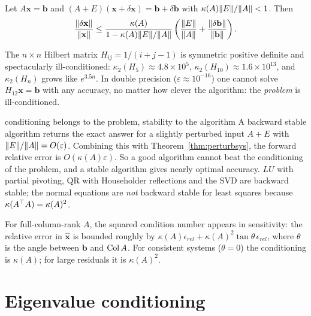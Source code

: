 \begin{theorem}[Sensitivity of $A\mathbf{x}=\mathbf{b}$]\label{thm:perturbsys}
Let $A\mathbf{x}=\mathbf{b}$ and $(A+E)(\mathbf{x}+\delta\mathbf{x})=\mathbf{b}+\delta\mathbf{b}$ with $\kappa(A)\lVert E\rVert/\lVert A\rVert<1$. Then
\[ \frac{\lVert\delta\mathbf{x}\rVert}{\lVert\mathbf{x}\rVert}\le\frac{\kappa(A)}{1-\kappa(A)\lVert E\rVert/\lVert A\rVert}\left(\frac{\lVert E\rVert}{\lVert A\rVert}+\frac{\lVert\delta\mathbf{b}\rVert}{\lVert\mathbf{b}\rVert}\right). \]
\end{theorem}

\begin{example}
The $n\times n$ Hilbert matrix $H_{ij}=1/(i+j-1)$ is symmetric positive definite and spectacularly ill-conditioned: $\kappa_2(H_5)\approx4.8\times10^5$, $\kappa_2(H_{10})\approx1.6\times10^{13}$, and $\kappa_2(H_n)$ grows like $e^{3.5n}$. In double precision ($\varepsilon\approx10^{-16}$) one cannot solve $H_{12}\mathbf{x}=\mathbf{b}$ with any accuracy, no matter how clever the algorithm: the \emph{problem} is ill-conditioned.
\end{example}

\begin{nuance}{conditioning belongs to the problem, stability to the algorithm}
A backward stable algorithm returns the exact answer for a slightly perturbed input $A+E$ with $\lVert E\rVert/\lVert A\rVert=O(\varepsilon)$. Combining this with Theorem~\ref{thm:perturbsys}, the forward relative error is $O(\kappa(A)\varepsilon)$. So a good algorithm cannot beat the conditioning of the problem, and a stable algorithm gives nearly optimal accuracy. $LU$ with partial pivoting, QR with Householder reflections and the SVD are backward stable; the normal equations are \emph{not} backward stable for least squares because $\kappa(A^{\top} A)=\kappa(A)^2$.
\end{nuance}

\begin{theorem}\label{thm:lscond}
For full-column-rank $A$, the squared condition number appears in sensitivity: the relative error in $\hat{\mathbf{x}}$ is bounded roughly by $\kappa(A)\epsilon_{rel}+\kappa(A)^2\tan\theta\,\epsilon_{rel}$, where $\theta$ is the angle between $\mathbf{b}$ and $\operatorname{Col} A$. For consistent systems ($\theta=0$) the conditioning is $\kappa(A)$; for large residuals it is $\kappa(A)^2$.
\end{theorem}

\section{Eigenvalue conditioning}

